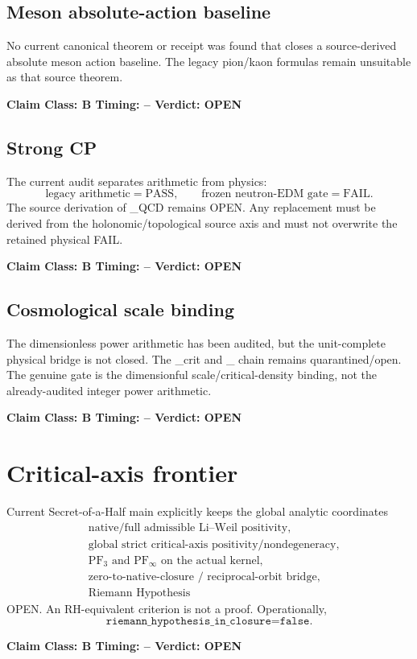 \documentclass[11pt,a4paper,twoside]{book}
\def\({}%
\def\){}%
\theoremstyle{definition}
\newcommand{\vTwelveStatus}[3]{\par\noindent\textbf{Claim Class: #1 \quad Timing: #2 \quad Verdict: #3}\par}
\begin{document}
\subsection{Meson absolute-action baseline}

No current canonical theorem or receipt was found that closes a source-derived
absolute meson action baseline. The legacy pion/kaon formulas remain unsuitable
as that source theorem.
\vTwelveStatus{B}{--}{OPEN}

\subsection{Strong CP}

The current audit separates arithmetic from physics:
\[
\boxed{
\text{legacy arithmetic}=\mathrm{PASS},
\qquad
\text{frozen neutron-EDM gate}=\mathrm{FAIL}.
}
\]
The source derivation of \(\theta_{\rm QCD}\) remains OPEN. Any replacement must
be derived from the holonomic/topological source axis and must not overwrite
the retained physical FAIL.
\vTwelveStatus{B}{--}{OPEN}

\subsection{Cosmological scale binding}

The dimensionless power arithmetic has been audited, but the unit-complete
physical bridge is not closed. The \(\rho_{\rm crit}\) and
\(\Omega_\Lambda\) chain remains quarantined/open. The genuine gate is the
dimensionful scale/critical-density binding, not the already-audited integer
power arithmetic.
\vTwelveStatus{B}{--}{OPEN}

\section{Critical-axis frontier}

Current Secret-of-a-Half main explicitly keeps the global analytic coordinates
\[
\boxed{
\begin{aligned}
&\text{native/full admissible Li--Weil positivity},\\
&\text{global strict critical-axis positivity/nondegeneracy},\\
&\mathrm{PF}_3\text{ and }\mathrm{PF}_\infty\text{ on the actual kernel},\\
&\text{zero-to-native-closure / reciprocal-orbit bridge},\\
&\text{Riemann Hypothesis}
\end{aligned}}
\]
OPEN. An RH-equivalent criterion is not a proof. Operationally,
\[
\boxed{\texttt{riemann\_hypothesis\_in\_closure=false}.}
\]
\vTwelveStatus{B}{--}{OPEN}
\end{document}
